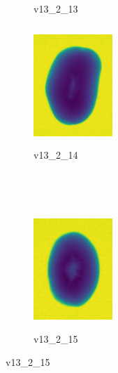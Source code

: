 \documentclass[11pt]{article}
\begin{document}
\begin{figure}
\begin{subfigure}[b]{0.15\textwidth}
        \caption{v13\_2\_13}
         \label{fig:five over x}
     \end{subfigure}
     \hfill
    \begin{subfigure}[b]{0.15\textwidth}
         \centering
         \includegraphics[width=3cm, height=4.5cm]{images/kartofler/v13_2_14_cut.png}
        \caption{v13\_2\_14}
         \label{fig:five over x}
     \end{subfigure}
     
     
     \\ \\
     
     
    \begin{subfigure}[b]{0.15\textwidth}
         \centering
         \includegraphics[width=3cm, height=4.5cm]{images/kartofler/v13_2_15_cut.png}
         \caption{v13\_2\_15}
         \label{fig:y equals x}
     \end{subfigure}
\end{figure}
\end{document}
